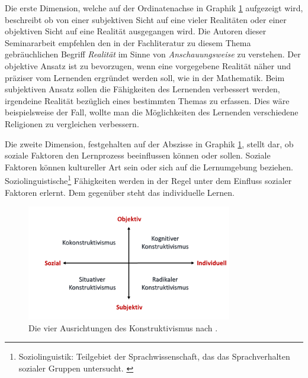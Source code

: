 Die erste Dimension, welche auf der Ordinatenachse in Graphik \ref{fig:Anderson.1999_4positions} aufgezeigt wird, beschreibt ob von einer subjektiven Sicht auf eine vieler Realitäten oder einer objektiven Sicht auf eine Realität ausgegangen wird. Die Autoren dieser Seminararbeit empfehlen den in der Fachliteratur zu diesem Thema gebräuchlichen Begriff \emph{Realität} im Sinne von \emph{Anschauungsweise} zu verstehen. %
Der objektive Ansatz ist zu bevorzugen, wenn eine vorgegebene Realität näher und präziser vom Lernenden ergründet werden soll, wie in der Mathematik. Beim subjektiven Ansatz sollen die Fähigkeiten des Lernenden verbessert werden, irgendeine Realität bezüglich eines bestimmten Themas zu erfassen. Dies wäre beispielsweise der Fall, wollte man die Möglichkeiten des Lernenden verschiedene Religionen zu vergleichen verbessern. \cite{Anderson.1999}

Die zweite Dimension, festgehalten auf der Abszisse in Graphik \ref{fig:Anderson.1999_4positions}, stellt dar, ob soziale Faktoren den Lernprozess beeinflussen können oder sollen. Soziale Faktoren können kultureller Art sein oder sich auf die Lernumgebung beziehen. Soziolinguistische\footnote{Soziolinguistik: Teilgebiet der Sprachwissenschaft, das das Sprachverhalten sozialer Gruppen untersucht. \cite{Duden.2006}} Fähigkeiten werden in der Regel unter dem Einfluss sozialer Faktoren erlernt. Dem gegenüber steht das individuelle Lernen. \cite{Anderson.1999} %

\begin{figure}
	\centering
	\includegraphics[width=0.8\textwidth]{Abbildungen/Anderson_1999_4positions.png}
	\caption{Die vier Ausrichtungen des Konstruktivismus nach \cite{Anderson.1999}.}
	\label{fig:Anderson.1999_4positions}
\end{figure} %

